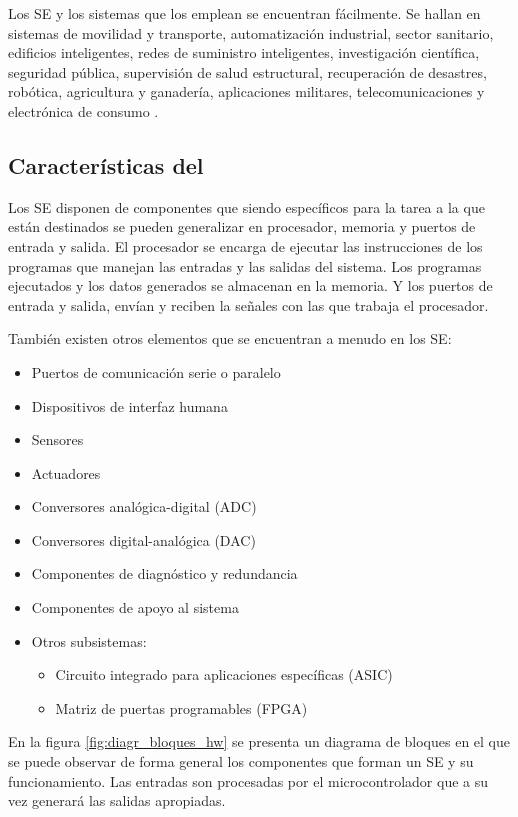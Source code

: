 Los SE y los sistemas que los emplean se encuentran fácilmente. Se hallan en 
sistemas de movilidad y transporte, automatización industrial, sector sanitario,
edificios inteligentes, redes de suministro inteligentes, investigación
científica, seguridad pública, supervisión de salud estructural, recuperación de
desastres, robótica, agricultura y ganadería, aplicaciones militares,
telecomunicaciones y electrónica de consumo \cite{marwedel2018}.

\subsection{Características del }{\label{sec:se-hw}}
Los SE disponen de componentes  que siendo específicos
para la tarea a la que están destinados se pueden generalizar en procesador,
memoria y puertos de entrada y salida. El procesador se encarga de ejecutar las
instrucciones de los programas que manejan las entradas y las salidas del
sistema. Los programas ejecutados y los datos generados se almacenan en la
memoria. Y los puertos de entrada y salida, envían y reciben la señales con las
que trabaja el procesador.\cite{jimenez2014}

También existen otros elementos que se encuentran a menudo en los SE:
\begin{itemize}
    \item Puertos de comunicación serie o paralelo
    \item Dispositivos de interfaz humana
    \item Sensores
    \item Actuadores
    \item Conversores analógica-digital (ADC)
    \item Conversores digital-analógica (DAC)
    \item Componentes de diagnóstico y redundancia
    \item Componentes de apoyo al sistema
    \item Otros subsistemas:
    \begin{itemize}
        \item Circuito integrado para aplicaciones específicas (ASIC)
        \item Matriz de puertas programables (FPGA)
    \end{itemize}
\end{itemize}

En la figura \ref{fig:diagr_bloques_hw} se presenta un diagrama de bloques
en el que se puede observar de forma general los componentes que forman un SE
y su funcionamiento. Las entradas son procesadas por el microcontrolador que a
su vez generará las salidas apropiadas. 

